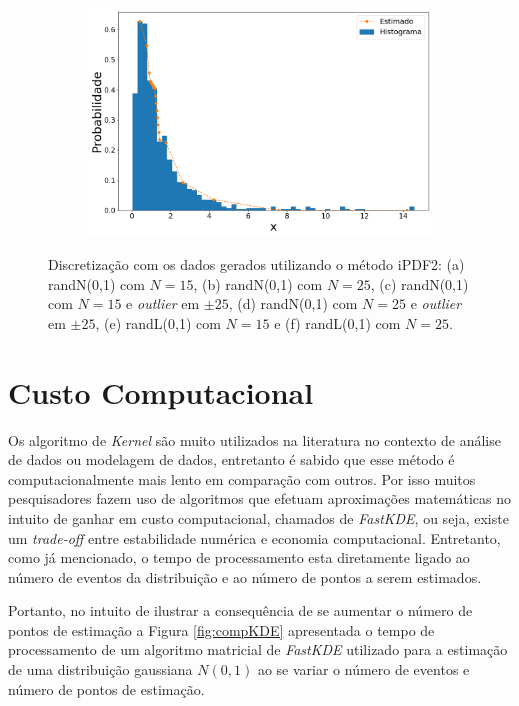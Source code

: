 \begin{figure}[H]
\begin{subfigure}[b]{0.45\textwidth}
		\includegraphics[width=\linewidth]{./figuras/iPDF2_lognormal_25_1_1000_0}
		\caption{}
		\label{fig:ipdf2_lognorm25_data}
	\end{subfigure}
	\caption{Discretização com os dados gerados utilizando o método \ac{iPDF2}: (a) randN(0,1) com $N = 15$, (b) randN(0,1) com $N = 25$, (c) randN(0,1) com $N = 15$ e \textit{outlier} em $\pm 25$, (d) randN(0,1) com $N = 25$ e \textit{outlier} em $\pm 25$, (e) randL(0,1) com $ N = 15 $ e (f) randL(0,1) com $ N = 25 $.}
	\label{fig:ipdf2_data}
\end{figure}


\section{Custo Computacional}

Os algoritmo de \textit{Kernel} são muito utilizados na literatura no contexto de análise de dados ou modelagem de dados, entretanto é sabido que esse método é computacionalmente mais lento em comparação com outros. Por isso muitos pesquisadores fazem uso de algoritmos que efetuam aproximações matemáticas no intuito de ganhar em custo computacional, chamados de \textit{FastKDE}, ou seja, existe um \textit{trade-off} entre estabilidade numérica e economia computacional. Entretanto, como já mencionado, o tempo de processamento esta diretamente ligado ao número de eventos da distribuição e ao número de pontos a serem estimados.

Portanto, no intuito de ilustrar a consequência de se aumentar o número de pontos de estimação a Figura \ref{fig:compKDE} apresentada o tempo de processamento de um algoritmo matricial de \textit{FastKDE} utilizado para a estimação de uma distribuição gaussiana $N(0,1)$ ao se variar o número de eventos e número de pontos de estimação.

